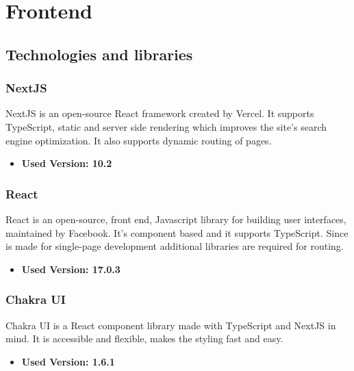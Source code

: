 \section{Frontend}
\subsection{Technologies and libraries}
\subsubsection{NextJS}
NextJS is an open-source React framework created by Vercel. It supports TypeScript, static and server side rendering which improves the site's search engine optimization. It also supports dynamic routing of pages.
\begin{itemize}
  \item \textbf{Used Version: 10.2}
\end{itemize}
\subsubsection{React}
React is an open-source, front end, Javascript library for building user interfaces, maintained by Facebook. It's component based and it supports TypeScript. Since is made for single-page development additional libraries are required for routing.
\begin{itemize}
  \item \textbf{Used Version: 17.0.3}
\end{itemize}
\subsubsection{Chakra UI}
Chakra UI is a React component library made with TypeScript and NextJS in mind. It is accessible and flexible, makes the styling fast and easy.
\begin{itemize}
  \item \textbf{Used Version: 1.6.1}
\end{itemize}

